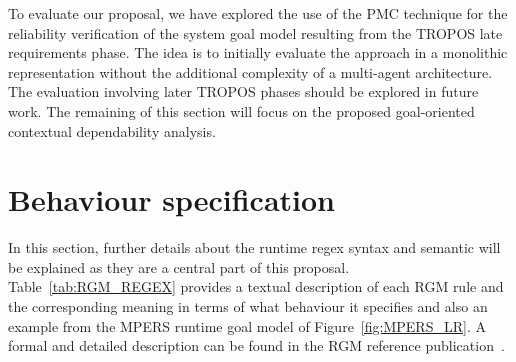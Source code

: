To evaluate our proposal, we have explored the use of the PMC technique for the reliability verification of the system goal model resulting from the TROPOS late requirements phase. The idea is to initially evaluate the approach in a monolithic representation without the additional complexity of a multi-agent architecture. The evaluation involving later TROPOS phases should be explored in future work. The remaining of this section will focus on the proposed goal-oriented contextual dependability analysis.




\section{Behaviour specification}\label{sec:behaviour_specification}

In this section, further details about the runtime regex syntax and semantic will be explained as they are a central part of this proposal. Table~\ref{tab:RGM_REGEX} provides a textual description of each RGM rule and the corresponding meaning in terms of what behaviour it specifies and also an example from the MPERS runtime goal model of Figure~\ref{fig:MPERS_LR}. A formal and detailed description can be found in the RGM reference publication~\cite{Dalpiaz:2013}.

